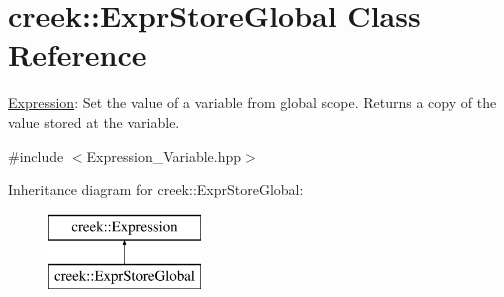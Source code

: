 \hypertarget{classcreek_1_1_expr_store_global}{}\section{creek\+:\+:Expr\+Store\+Global Class Reference}
\label{classcreek_1_1_expr_store_global}


\hyperlink{classcreek_1_1_expression}{Expression}\+: Set the value of a variable from global scope. Returns a copy of the value stored at the variable.  




{\ttfamily \#include $<$Expression\+\_\+\+Variable.\+hpp$>$}

Inheritance diagram for creek\+:\+:Expr\+Store\+Global\+:\begin{figure}[H]
\begin{center}
\leavevmode
\includegraphics[height=2.000000cm]{classcreek_1_1_expr_store_global}
\end{center}
\end{figure}
